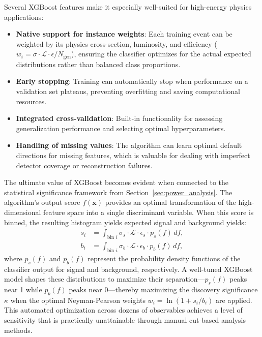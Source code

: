Several XGBoost features make it especially well-suited for high-energy physics applications:

\begin{itemize}
    \item \textbf{Native support for instance weights}: Each training event can be weighted by its physics cross-section, luminosity, and efficiency ($w_i = \sigma \cdot \mathcal{L} \cdot \epsilon / N_{\text{gen}}$), ensuring the classifier optimizes for the actual expected distributions rather than balanced class proportions.
    
    \item \textbf{Early stopping}: Training can automatically stop when performance on a validation set plateaus, preventing overfitting and saving computational resources.
    
    \item \textbf{Integrated cross-validation}: Built-in functionality for assessing generalization performance and selecting optimal hyperparameters.
    
    \item \textbf{Handling of missing values}: The algorithm can learn optimal default directions for missing features, which is valuable for dealing with imperfect detector coverage or reconstruction failures.
\end{itemize}


The ultimate value of XGBoost becomes evident when connected to the statistical significance framework from Section~\ref{sec:power_analysis}. The algorithm's output score $f(\mathbf{x})$ provides an optimal transformation of the high-dimensional feature space into a single discriminant variable. When this score is binned, the resulting histogram yields expected signal and background yields:
\begin{align}
s_i &= \int_{\text{bin } i} \sigma_s \cdot \mathcal{L} \cdot \epsilon_s \cdot p_s(f) \, df, \\
b_i &= \int_{\text{bin } i} \sigma_b \cdot \mathcal{L} \cdot \epsilon_b \cdot p_b(f) \, df,
\end{align}
where $p_s(f)$ and $p_b(f)$ represent the probability density functions of the classifier output for signal and background, respectively. A well-tuned XGBoost model shapes these distributions to maximize their separation—$p_s(f)$ peaks near 1 while $p_b(f)$ peaks near 0—thereby maximizing the discovery significance $\kappa$ when the optimal Neyman-Pearson weights $w_i = \ln(1 + s_i/b_i)$ are applied. This automated optimization across dozens of observables achieves a level of sensitivity that is practically unattainable through manual cut-based analysis methods.


